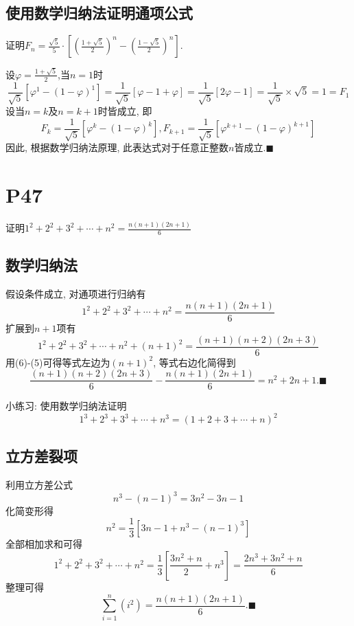 \documentclass{book}
\begin{document}
    \subsection{使用数学归纳法证明通项公式}
    证明${\displaystyle F_{n}={\frac {\sqrt {5}}{5}}\cdot \left[\left({\frac {1+{\sqrt {5}}}{2}}\right)^{n}-\left({\frac {1-{\sqrt {5}}}{2}}\right)^{n}\right]}$.

    设$\varphi={\displaystyle {\frac {1+{\sqrt {5}}}{2}}}$,当${\displaystyle n=1}$时$${\displaystyle {\frac {1}{\sqrt {5}}}[\varphi ^{1}-(1-\varphi )^{1}]={\frac {1}{\sqrt {5}}}[\varphi -1+\varphi ]={\frac {1}{\sqrt {5}}}[2\varphi -1]={\frac {1}{\sqrt {5}}}\times {\sqrt {5}}=1=F_{1}}$$
    设当${\displaystyle n=k}$及${\displaystyle n=k+1}$时皆成立, 即$${\displaystyle F_{k}={\frac {1}{\sqrt {5}}}[\varphi ^{k}-(1-\varphi )^{k}]},{\displaystyle F_{k+1}={\frac {1}{\sqrt {5}}}[\varphi ^{k+1}-(1-\varphi )^{k+1}]}$$
    因此, 根据数学归纳法原理, 此表达式对于任意正整数${\displaystyle n}$皆成立.$\blacksquare$ \cite{induction}

    \section{\textcolor[rgb]{0.11,0.65,0.52}{P47}}
    \begin{boxB}
        证明$\displaystyle 1^2+2^2+3^2+\cdots+n^2=\frac{n\left( n+1 \right)\left( 2n+1 \right)}{6}$
    \end{boxB}
    \subsection{数学归纳法}
    假设条件成立, 对通项进行归纳有
    \begin{equation}
        1^2+2^2+3^2+\cdots+n^2=\frac{n\left( n+1 \right)\left( 2n+1 \right)}{6}
    \end{equation}
    扩展到$n+1$项有
    \begin{equation}
        1^2+2^2+3^2+\cdots+n^2+\left( n+1 \right)^2=\frac{\left( n+1 \right)\left( n+2 \right)\left( 2n+3 \right)}{6}
    \end{equation}
    用(6)-(5)可得等式左边为$\left( n+1 \right)^2$, 等式右边化简得到$$\frac{\left( n+1 \right)\left( n+2 \right)\left( 2n+3 \right)}{6}-\frac{n\left( n+1 \right)\left( 2n+1 \right)}{6}=n^2+2n+1.\blacksquare$$
    \begin{boxB}
        小练习: 使用数学归纳法证明$$1^3+2^3+3^3+\cdots+n^3=\left( 1+2+3+\cdots+n \right)^2$$
    \end{boxB}
    \subsection{立方差裂项}
    利用立方差公式$$n^3-\left( n-1 \right)^3=3n^2-3n-1$$化简变形得$$n^2=\frac{1}{3}\left[ 3n-1+n^3-\left( n-1 \right)^3 \right]$$全部相加求和可得$$1^2+2^2+3^2+\cdots+n^2=\frac{1}{3}\left[ \frac{3n^2+n}{2}+n^3 \right]=\frac{2n^3+3n^2+n}{6}$$
    整理可得$$\sum_{i=1}^{n}\left ( i^2 \right )  =\frac{n(n+1)(2n+1)}{6} .\blacksquare$$
\end{document}
